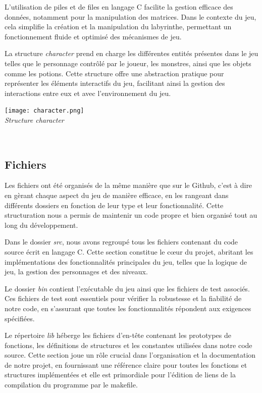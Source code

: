 \documentclass[10pt]{article}
\begin{document}
\begin{center}
L'utilisation de piles et de files en langage C facilite la gestion efficace des données, notamment pour la manipulation des matrices. Dans le contexte du jeu, cela simplifie la création et la manipulation du labyrinthe, permettant un fonctionnement fluide et optimisé des mécanismes de jeu.

La structure \textit{\gls{character}} prend en charge les différentes entités présentes dans le jeu telles que le personnage contrôlé par le joueur, les monstres, ainsi que les objets comme les potions. Cette structure offre une abstraction pratique pour représenter les éléments interactifs du jeu, facilitant ainsi la gestion des interactions entre eux et avec l'environnement du jeu.
\begin{center}
\texttt{[image: character.png]}\\
\caption{{\emph{Structure character}}}
\label{fig3}\\
\end{center}


\subsection{Fichiers}

Les fichiers ont été organisés de la même manière que sur le Github, c'est à dire en gèrant chaque aspect du jeu de manière efficace, en les rangeant dans différents dossiers en fonction de leur type et leur fonctionnalité. Cette structuration nous a permis de maintenir un code propre et bien organisé tout au long du développement.

Dans le dossier \textit{src}, nous avons regroupé tous les fichiers contenant du code source écrit en langage C. Cette section constitue le cœur du projet, abritant les implémentations des fonctionnalités principales du jeu, telles que la logique de jeu, la gestion des personnages et des niveaux.

Le dossier \textit{bin} contient l'exécutable du jeu ainsi que les fichiers de test associés. Ces fichiers de test sont essentiels pour vérifier la robustesse et la fiabilité de notre code, en s'assurant que toutes les fonctionnalités répondent aux exigences spécifiées.

Le répertoire \textit{lib} héberge les fichiers d'en-tête contenant les prototypes de fonctions, les définitions de structures et les constantes utilisées dans notre code source. Cette section joue un rôle crucial dans l'organisation et la documentation de notre projet, en fournissant une référence claire pour toutes les fonctions et structures implémentées et elle est primordiale pour l'édition de liens de la compilation du programme par le makefile.


\end{center}
\end{document}
